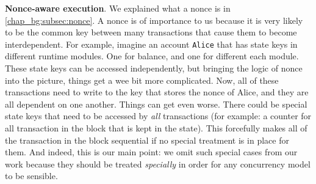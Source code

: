 \textbf{Nonce-aware execution}. We explained what a nonce is in \ref{chap_bg:subsec:nonce}. A nonce is of importance
to us because it is very likely to be the common key between many transactions that cause them to
become interdependent. For example, imagine an account \texttt{Alice} that has state keys in
different runtime modules. One for balance, and one for different each module. These state keys can
be accessed independently, but bringing the logic of nonce into the picture, things get a wee bit
more complicated. Now, all of these transactions need to write to the key that stores the nonce of
Alice, and they are all dependent on one another. Things can get even worse. There could be special
state keys that need to be accessed by \textit{all} transactions (for example: a counter for all
transaction in the block that is kept in the state). This forcefully makes all of the transaction in
the block sequential if no special treatment is in place for them. And indeed, this is our main
point: we omit such special cases from our work because they should be treated \textit{specially} in order
for any concurrency model to be sensible.